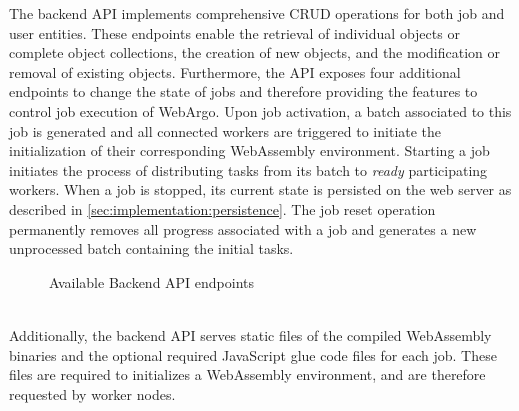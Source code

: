 The backend \ac{API} implements comprehensive \ac{CRUD} operations for both job and user entities. These endpoints enable the retrieval of individual objects or complete object collections, the creation of new objects, and the modification or removal of existing objects. Furthermore, the \ac{API} exposes four additional endpoints to change the state of jobs and therefore providing the features to control job execution of WebArgo. Upon job activation, a batch associated to this job is generated and all connected workers are triggered to initiate the initialization of their corresponding WebAssembly environment. Starting a job initiates the process of distributing tasks from its batch to \emph{ready} participating workers. When a job is stopped, its current state is persisted on the web server as described in \autoref{sec:implementation:persistence}. The job reset operation permanently removes all progress associated with a job and generates a new unprocessed batch containing the initial tasks.
\begin{figure}[bth]
    \myfloatalign
     \quad \quad
    \caption{Available Backend \ac{API} endpoints}
    \label{fig:implementation:backend}
\end{figure}
~\\
Additionally, the backend \ac{API} serves static files of the compiled WebAssembly binaries and the optional required JavaScript glue code files for each job. These files are required to initializes a WebAssembly environment, and are therefore requested by worker nodes.

